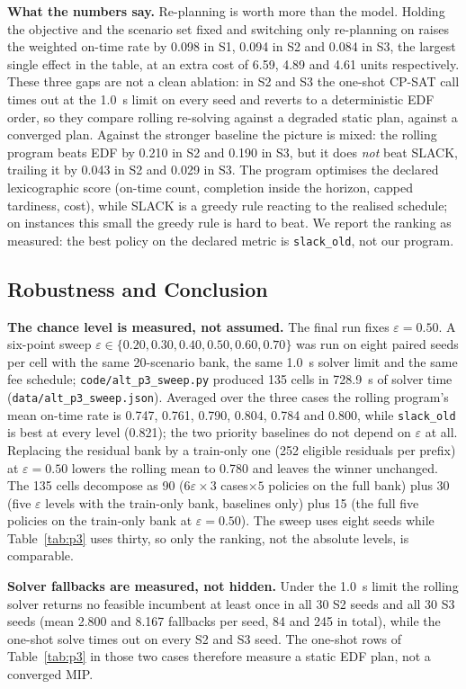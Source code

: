\documentclass{swmcmthesis}
\begin{document}
\textbf{What the numbers say.} Re-planning is worth more than the model. Holding the objective and the scenario set fixed and switching only re-planning on raises the weighted on-time rate by 0.098 in S1, 0.094 in S2 and 0.084 in S3, the largest single effect in the table, at an extra cost of 6.59, 4.89 and 4.61 units respectively. These three gaps are not a clean ablation: in S2 and S3 the one-shot CP-SAT call times out at the 1.0~s limit on every seed and reverts to a deterministic EDF order, so they compare rolling re-solving against a degraded static plan, against a converged plan. Against the stronger baseline the picture is mixed: the rolling program beats EDF by 0.210 in S2 and 0.190 in S3, but it does \emph{not} beat SLACK, trailing it by 0.043 in S2 and 0.029 in S3. The program optimises the declared lexicographic score (on-time count, completion inside the horizon, capped tardiness, cost), while SLACK is a greedy rule reacting to the realised schedule; on instances this small the greedy rule is hard to beat. We report the ranking as measured: the best policy on the declared metric is \texttt{slack\_old}, not our program.
\subsection{Robustness and Conclusion}
\textbf{The chance level is measured, not assumed.} The final run fixes $\varepsilon=0.50$. A six-point sweep $\varepsilon\in\{0.20,0.30,0.40,0.50,0.60,0.70\}$ was run on eight paired seeds per cell with the same 20-scenario bank, the same 1.0~s solver limit and the same fee schedule; \texttt{code/alt\_p3\_sweep.py} produced 135 cells in 728.9~s of solver time (\texttt{data/alt\_p3\_sweep.json}). Averaged over the three cases the rolling program's mean on-time rate is 0.747, 0.761, 0.790, 0.804, 0.784 and 0.800, while \texttt{slack\_old} is best at every level (0.821); the two priority baselines do not depend on $\varepsilon$ at all. Replacing the residual bank by a train-only one (252 eligible residuals per prefix) at $\varepsilon=0.50$ lowers the rolling mean to 0.780 and leaves the winner unchanged. The 135 cells decompose as 90 ($6\varepsilon\times3$ cases$\times5$ policies on the full bank) plus 30 (five $\varepsilon$ levels with the train-only bank, baselines only) plus 15 (the full five policies on the train-only bank at $\varepsilon=0.50$). The sweep uses eight seeds while Table~\ref{tab:p3} uses thirty, so only the ranking, not the absolute levels, is comparable.

\textbf{Solver fallbacks are measured, not hidden.} Under the 1.0~s limit the rolling solver returns no feasible incumbent at least once in all 30 S2 seeds and all 30 S3 seeds (mean 2.800 and 8.167 fallbacks per seed, 84 and 245 in total), while the one-shot solve times out on every S2 and S3 seed. The one-shot rows of Table~\ref{tab:p3} in those two cases therefore measure a static EDF plan, not a converged MIP.
\end{document}
